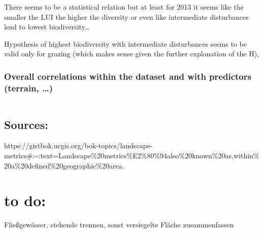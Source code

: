 \documentclass[
  letterpaper,
  DIV=11,
  numbers=noendperiod]{scrartcl}
\begin{document}
\begin{figure}
\begin{minipage}[t]{0.33\linewidth}
\end{minipage}%
%
\begin{minipage}[t]{0.33\linewidth}

{\centering 


}

\end{minipage}%

\end{figure}

There seems to be a statistical relation but at least for 2013 it seems
like the smaller the LUI the higher the diversity or even like
intermediate disturbances lead to lowest biodiversity\ldots{}

Hypothesis of highest biodiversity with intermediate disturbances seems
to be valid only for grazing (which makes sense given the further
explanation of the H),

\hypertarget{overall-correlations-within-the-dataset-and-with-predictors-terrain}{%
\subsubsection{Overall correlations within the dataset and with
predictors (terrain,
\ldots)}\label{overall-correlations-within-the-dataset-and-with-predictors-terrain}}

\begin{verbatim}
\end{verbatim}

\hypertarget{sources}{%
\subsection{Sources:}\label{sources}}

https://gistbok.ucgis.org/bok-topics/landscape-metrics\#:\textasciitilde:text=Landscape\%20metrics\%E2\%80\%94also\%20known\%20as,within\%20a\%20defined\%20geographic\%20area.

\hypertarget{to-do}{%
\section{to do:}\label{to-do}}

Fließgewässer, stehende trennen, sonst versiegelte Fläche zusammenfassen
\end{document}
